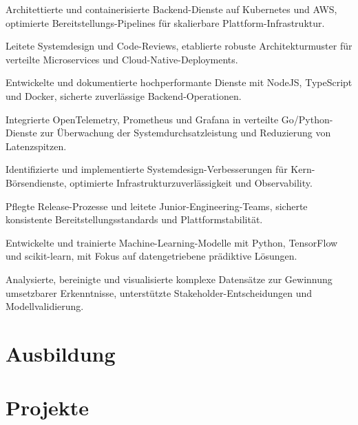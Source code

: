 \documentclass[10pt,a4paper]{resume}
\begin{document}
\bullets
  \item Architettierte und containerisierte Backend-Dienste auf Kubernetes und AWS, optimierte Bereitstellungs-Pipelines für skalierbare Plattform-Infrastruktur.
  \item Leitete Systemdesign und Code-Reviews, etablierte robuste Architekturmuster für verteilte Microservices und Cloud-Native-Deployments.
  \item Entwickelte und dokumentierte hochperformante Dienste mit NodeJS, TypeScript und Docker, sicherte zuverlässige Backend-Operationen.
\bulletsend
\vspace{1.5pt}
\bullets
  \item Integrierte OpenTelemetry, Prometheus und Grafana in verteilte Go/Python-Dienste zur Überwachung der Systemdurchsatzleistung und Reduzierung von Latenzspitzen.
  \item Identifizierte und implementierte Systemdesign-Verbesserungen für Kern-Börsendienste, optimierte Infrastrukturzuverlässigkeit und Observability.
  \item Pflegte Release-Prozesse und leitete Junior-Engineering-Teams, sicherte konsistente Bereitstellungsstandards und Plattformstabilität.
\bulletsend
\vspace{1.5pt}
\bullets
  \item Entwickelte und trainierte Machine-Learning-Modelle mit Python, TensorFlow und scikit-learn, mit Fokus auf datengetriebene prädiktive Lösungen.
  \item Analysierte, bereinigte und visualisierte komplexe Datensätze zur Gewinnung umsetzbarer Erkenntnisse, unterstützte Stakeholder-Entscheidungen und Modellvalidierung.
\bulletsend
\vspace{1.5pt}

\section{Ausbildung}

\vspace{2pt}

\section{Projekte}
\end{document}
